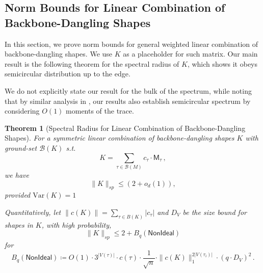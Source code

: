 \documentclass[12pt]{article}
\newcommand{\Var}{\mathrm{Var}}
\newtheorem{theorem}{Theorem}[section]
\newcommand{\calB}{\mathcal{B}}
\newcommand{\cm}{\mathsf{M} }
\begin{document}
\subsection{Norm Bounds for Linear Combination of Backbone-Dangling Shapes}

In this section, we prove norm bounds for general weighted linear combination of backbone-dangling shapes. We use $K$ as a placeholder for such matrix. Our main result is the following theorem for the spectral radius of $K$, which shows it obeys semicircular distribution up to the edge.

We do not explicitly state our result for the bulk of the spectrum, while noting that by similar analysis in \cite{PotechinXu2026Theta}, our results also establish semicircular spectrum by considering $O(1)$ moments of the trace.


\begin{theorem}[Spectral Radius for Linear Combination of Backbone-Dangling Shapes]
\label{thm:Q-norm}
	For a symmetric linear combination of backbone-dangling shapes $K$ with ground-set $\calB(K)$ s.t. \[ 
	K = \sum_{\tau \in\calB(M)} c_\tau \cdot \cm_{\tau}\,,
	\] we have \[ 
	\|K \|_{sp} \leq (2+o_d(1))  ,
	\]
	provided $\Var(K)=1$ 
	
	Quantitatively, let $\|c(K)\| = \sum_{\tau\in B(K)} |c_\tau|$ and $D_V$ be the size bound for shapes in $K$,  with high probability, \[ 
	\|K \|_{sp} \leq 2 + B_q(\mathsf{NonIdeal}) 
	\]	for \[ 
	B_q(\mathsf{NonIdeal}) \coloneqq  O(1) \cdot 3^{|V(\tau)|} \cdot   c(\tau) \cdot    \frac{1}{\sqrt{n}} \cdot \|c(K)\|_1^{  2|V(\tau_i)|}  \cdot (q\cdot D_V)^{2}\,.
	\]
\end{theorem}
	
\end{document}
